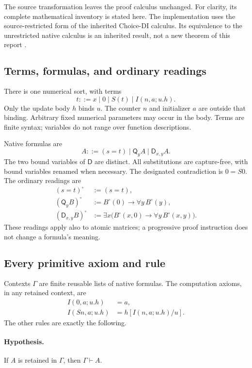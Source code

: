 \documentclass[11pt]{article}
\theoremstyle{definition}\newtheorem{definition}[theorem]{Definition}
\theoremstyle{remark}\newtheorem{remark}[theorem]{Remark}
\newcommand{\Q}{\mathsf Q}
\newcommand{\D}{\mathsf D}
\begin{document}
The source transformation leaves the proof calculus unchanged. For
clarity, its complete mathematical inventory is stated here. The
implementation uses the source-restricted form of the inherited
Choice-DI calculus. Its equivalence to the unrestricted native calculus
is an inherited result, not a new theorem of this report
\cite{readme,native,inherited}.

\subsection{Terms, formulas, and ordinary readings}

There is one numerical sort, with terms
\[
 t ::= x\mid 0\mid S(t)\mid I(n,a;u.h).
\]
Only the update body $h$ binds $u$. The counter $n$ and initializer $a$
are outside that binding. Arbitrary fixed numerical parameters may occur
in the body. Terms are finite syntax; variables do not range over
function descriptions.

Native formulas are
\[
 A ::= (s=t)\mid \Q_y A\mid \D_{x,y} A.
\]
The two bound variables of $\D$ are distinct. All substitutions are
capture-free, with bound variables renamed when necessary. The designated
contradiction is $0=S0$. The ordinary readings are
\begin{align*}
 (s=t)^\circ&:=(s=t),\\
 (\Q_yB)^\circ&:=B^\circ(0)\to\forall y\,B^\circ(y),\\
 (\D_{x,y}B)^\circ&:=\exists x\bigl(B^\circ(x,0)\to
                                  \forall y\,B^\circ(x,y)\bigr).
\end{align*}
These readings apply also to atomic matrices; a progressive proof
instruction does not change a formula's meaning.

\subsection{Every primitive axiom and rule}

Contexts $\Gamma$ are finite reusable lists of native formulas. The
computation axioms, in any retained context, are
\begin{align}
 I(0,a;u.h)&=a,\tag{I0}\label{eq:I0}\\
 I(Sn,a;u.h)&=h[I(n,a;u.h)/u].\tag{IS}\label{eq:IS}
\end{align}
The other rules are exactly the following.

\paragraph{Hypothesis.}
If $A$ is retained in $\Gamma$, then $\Gamma\vdash A$.
\end{document}
